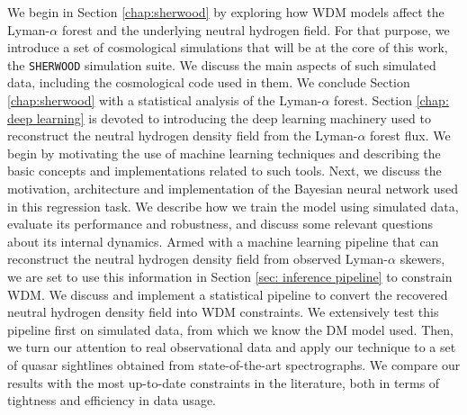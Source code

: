 We begin in Section \ref{chap:sherwood} by exploring how WDM models affect the Lyman-$\alpha$ forest and the underlying neutral hydrogen field. For that purpose, we introduce a set of cosmological simulations that will be at the core of this work, the \texttt{SHERWOOD} simulation suite. We discuss the main aspects of such simulated data, including the cosmological code used in them. We conclude Section \ref{chap:sherwood} with a statistical analysis of the Lyman-$\alpha$ forest. Section \ref{chap: deep learning} is devoted to introducing the deep learning machinery used to reconstruct the neutral hydrogen density field from the Lyman-$\alpha$ forest flux. We begin by motivating the use of machine learning techniques and describing the basic concepts and implementations related to such tools. Next, we discuss the motivation, architecture and implementation of the Bayesian neural network used in this regression task. We describe how we train the model using simulated data, evaluate its performance and robustness, and discuss some relevant questions about its internal dynamics. Armed with a machine learning pipeline that can reconstruct the neutral hydrogen density field from observed Lyman-$\alpha$ skewers, we are set to use this information in Section \ref{sec: inference pipeline} to constrain WDM. We discuss and implement a statistical pipeline to convert the recovered neutral hydrogen density field into WDM constraints. We extensively test this pipeline first on simulated data, from which we know the DM model used. Then, we turn our attention to real observational data and apply our technique to a set of quasar sightlines obtained from state-of-the-art spectrographs. We compare our results with the most up-to-date constraints in the literature, both in terms of tightness and efficiency in data usage.
